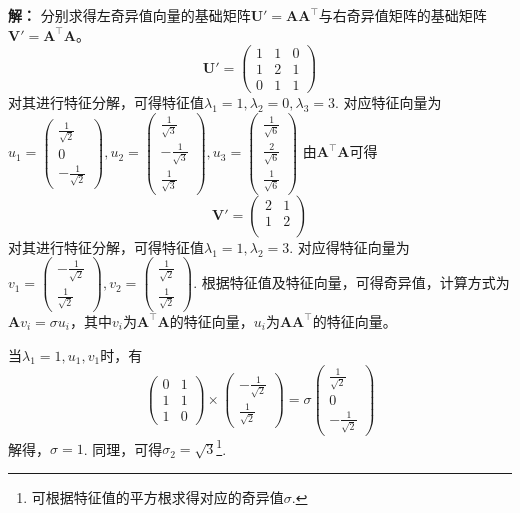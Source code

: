 \documentclass[12pt,a4paper]{article}
\begin{document}
  \textbf{解：} 分别求得左奇异值向量的基础矩阵$\mathbf{U'} = \mathbf{AA}^{\top}$与右奇异值矩阵的基础矩阵$\mathbf{V'} = \mathbf{A}^{\top}\mathbf{A}$。
  $$
  \mathbf{U'} = \left(\begin{array}{ccc}
    1 & 1 & 0 \\ 
    1 & 2 & 1 \\ 
    0 & 1 & 1
  \end{array}\right)
  $$
  对其进行特征分解，可得特征值$\lambda _1 = 1, \lambda _2 = 0, \lambda _3 = 3$. 对应特征向量为$u_1 = \left(\begin{array}{c}
    \frac{1}{\sqrt{2}} \\ 
    0 \\ 
    -\frac{1}{\sqrt{2}}
  \end{array}\right), u_2 = \left(\begin{array}{c}
    \frac{1}{\sqrt{3}} \\ 
    -\frac{1}{\sqrt{3}} \\ 
    \frac{1}{\sqrt{3}}
  \end{array}\right), u_3 = \left(\begin{array}{c}
    \frac{1}{\sqrt{6}} \\ 
    \frac{2}{\sqrt{6}} \\ 
    \frac{1}{\sqrt{6}}
  \end{array}\right)$
  由$\mathbf{A}^{\top}\mathbf{A}$可得
  $$
  \mathbf{V'} = \left(\begin{array}{cc}
    2 & 1 \\ 
    1 & 2 \\ 
  \end{array}\right)
  $$
  对其进行特征分解，可得特征值$\lambda _1 = 1, \lambda _2 = 3$. 对应得特征向量为
  $v_1 = \left(\begin{array}{c}
    -\frac{1}{\sqrt{2}} \\ 
    \frac{1}{\sqrt{2}}
  \end{array}\right), v_2 = \left(\begin{array}{c}
    \frac{1}{\sqrt{2}} \\ 
    \frac{1}{\sqrt{2}} 
  \end{array}\right)$. 根据特征值及特征向量，可得奇异值，计算方式为$\mathbf{A}v_i=\sigma u_i$，其中$v_i$为$\mathbf{A}^{\top}\mathbf{A}$的特征向量，$u_i$为$\mathbf{AA}^\top$的特征向量。 

  当$\lambda _1 = 1, u_1, v_1$时，有
  $$
  \left(\begin{array}{cc}
    0 & 1 \\ 
    1 & 1 \\ 
    1 & 0
  \end{array}\right) \times \left(\begin{array}{c}
    -\frac{1}{\sqrt{2}} \\ 
    \frac{1}{\sqrt{2}}
  \end{array}\right) = \sigma \left(\begin{array}{c}
    \frac{1}{\sqrt{2}} \\ 
    0 \\ 
    -\frac{1}{\sqrt{2}}
  \end{array}\right)
  $$
  解得，$\sigma = 1$. 同理，可得$\sigma _2 = \sqrt{3}$\footnote{可根据特征值的平方根求得对应的奇异值$\sigma$.}.
\end{document}
